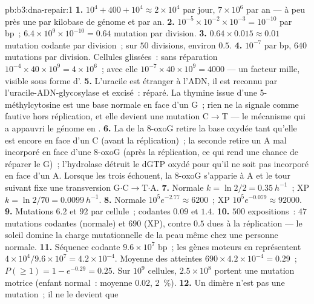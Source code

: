 \begin{solution}{pb:b3:dna-repair:1}
\textbf{1.} $10^{4} + 400 + 10^{4} \approx 2\times 10^{4}$  par
jour, $7\times 10^{6}$ par an --- à peu près une par kilobase de génome
et par an.
\textbf{2.} $10^{-5}\times 10^{-2}\times 10^{-3} = 10^{-10}$ par bp~;
$6.4\times 10^{9}\times 10^{-10} = 0.64$ mutation par division.
\textbf{3.} $0.64\times 0.015 \approx 0.01$ mutation codante par
division~; sur $50$ divisions, environ $0.5$.
\textbf{4.} $10^{-7}$ par bp, $640$ mutations par division. Cellules
glissées~: sans réparation
$10^{-4}\times 40\times 10^{9} = 4\times 10^{6}$~; avec elle
$10^{-7}\times 40\times 10^{9} = 4000$ --- un facteur mille, visible
sous forme d'.
\textbf{5.} L'uracile est étranger à l'ADN, il est reconnu par
l'uracile-ADN-glycosylase et excisé~: réparé. La thymine issue d'une
5-méthylcytosine est une base normale en face d'un G~; rien ne la
signale comme fautive hors réplication, et elle devient une mutation
C$\to$T --- le mécanisme qui a appauvri le génome en .
\textbf{6.} La  de la 8-oxoG retire la base oxydée tant
qu'elle est encore en face d'un C (avant la réplication)~; la seconde
 retire un A mal incorporé en face d'une 8-oxoG (après la
réplication, ce qui rend une chance de réparer le G)~; l'hydrolase
détruit le dGTP oxydé pour qu'il ne soit pas incorporé en face d'un A.
Lorsque les trois échouent, la 8-oxoG s'apparie à A et le tour suivant
fixe une transversion G$\cdot$C$\to$T$\cdot$A.
\textbf{7.} Normale $k = \ln 2/2 = \qty{0.35}{h^{-1}}$~; XP $k = \ln 2/70
= \qty{0.0099}{h^{-1}}$.
\textbf{8.} Normale $10^{5} e^{-2.77} \approx 6200$~; XP $10^{5}
e^{-0.079} \approx \num{92000}$.
\textbf{9.} Mutations $6.2$ et $92$ par cellule~; codantes $0.09$ et $1.4$.
\textbf{10.} $500$ expositions~: $47$ mutations codantes (normale) et
$690$ (XP), contre $0.5$ dues à la réplication --- le soleil domine la
charge mutationnelle de la peau même chez une personne normale.
\textbf{11.} Séquence codante $9.6\times 10^{7}$ bp~; les gènes moteurs
en représentent $4\times 10^{4}/9.6\times 10^{7} = 4.2\times 10^{-4}$.
Moyenne des atteintes $690\times 4.2\times 10^{-4} = 0.29$~;
$P(\ge 1) = 1 - e^{-0.29} =
0.25$. Sur $10^{9}$ cellules, $2.5\times 10^{8}$ portent une mutation
motrice (enfant normal~: moyenne $0.02$, \qty{2}{\%}).
\textbf{12.} Un dimère n'est pas une mutation~; il ne le devient que

\end{solution}
